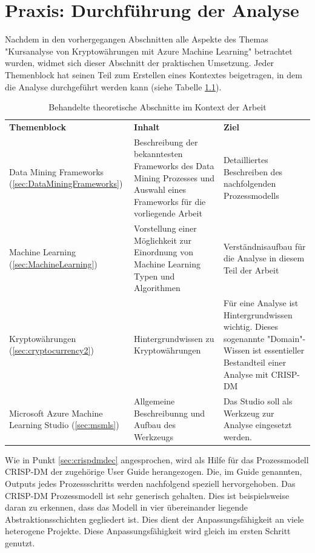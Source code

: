 \chapter{Praxis: Durchführung der Analyse}
Nachdem in den vorhergegangen Abschnitten alle Aspekte des Themas "Kursanalyse von Kryptowährungen mit Azure Machine Learning" betrachtet wurden, widmet sich dieser Abschnitt der praktischen Umsetzung. Jeder Themenblock hat seinen Teil zum Erstellen eines Kontextes beigetragen, in dem die Analyse durchgeführt werden kann (siehe Tabelle \ref{tab:themeblocks}).
\begin{table}[H]
\begin{tabular}{|p{}|p{6cm}|p{7cm}|}
\hline
\textbf{Themenblock} & \textbf{Inhalt} & \textbf{Ziel}\\ 
\hhline{===}
Data Mining Frameworks (\ref{sec:DataMiningFrameworks}) & Beschreibung der bekanntesten Frameworks des Data Mining Prozesses und Auswahl eines Frameworks für die vorliegende Arbeit & Detailliertes Beschreiben des nachfolgenden Prozessmodells\\
\hline
Machine Learning (\ref{sec:MachineLearning}) & Vorstellung einer Möglichkeit zur Einordnung von Machine Learning Typen und Algorithmen & Verständnisaufbau für die Analyse in diesem Teil der Arbeit\\
\hline
Kryptowährungen (\ref{sec:cryptocurrency2}) & Hintergrundwissen zu Kryptowährungen & Für eine Analyse ist Hintergrundwissen wichtig. Dieses sogenannte "Domain"-Wissen ist essentieller Bestandteil einer Analyse mit CRISP-DM\\
\hline
Microsoft Azure Machine Learning Studio (\ref{sec:msmls}) & Allgemeine Beschreibunng und Aufbau des Werkzeugs & Das Studio soll als Werkzeug zur Analyse eingesetzt werden.\\
\hline
\end{tabular}
\caption{Behandelte theoretische Abschnitte im Kontext der Arbeit}
\label{tab:themeblocks}
\end{table}
Wie in Punkt \ref{sec:crispdmdec} angesprochen, wird als Hilfe für das Prozessmodell CRISP-DM der zugehörige User Guide \citep[S.~30-56]{chapman_crisp-dm_2000} herangezogen. Die, im Guide genannten, Outputs jedes Prozessschritts werden nachfolgend speziell hervorgehoben. Das CRISP-DM Prozessmodell ist sehr generisch gehalten. Dies ist beispielsweise daran zu erkennen, dass das Modell in vier übereinander liegende Abstraktionsschichten gegliedert ist.\citep[S.~6]{chapman_crisp-dm_2000} Dies dient der Anpassungsfähigkeit an viele heterogene Projekte. Diese Anpassungsfähigkeit wird gleich im ersten Schritt genutzt.\newline
 
